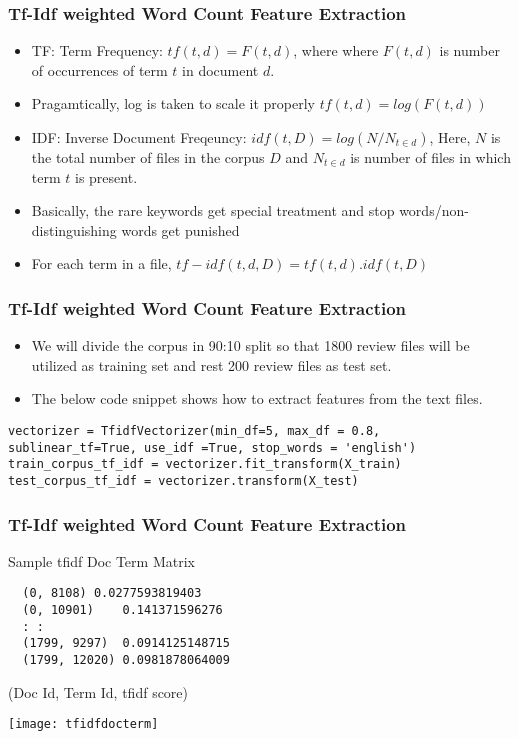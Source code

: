 \begin{frame}[fragile]\frametitle{Tf-Idf weighted Word Count Feature Extraction}
  \begin{itemize}
  \item TF: Term Frequency: $tf(t,d) = F(t,d)$, where where $F(t,d)$ is number of occurrences of term $t$ in document $d$. 
  \item Pragamtically, log is taken to scale it properly $tf(t,d) = log(F(t,d))$
  \item IDF: Inverse Document Freqeuncy: $idf(t,D) = log(N/N_{t \in d})$, Here, $N$ is the total number of files in the corpus $D$ and $N_{t \in d}$ is number of files in which term $t$ is present. 
  \item Basically, the rare keywords get special treatment and stop words/non-distinguishing words get punished
  \item For each term in a file, $tf-idf(t,d,D) = tf(t,d) . idf(t,D)$
  \end{itemize}
\end{frame}

\begin{frame}[fragile]\frametitle{Tf-Idf weighted Word Count Feature Extraction}
  \begin{itemize}
  \item We will divide the corpus in 90:10 split so that 1800 review files will be utilized as training set and rest 200 review files as test set. 
  \item The below code snippet shows how to extract features from the text files.
  \end{itemize}
    \begin{lstlisting}
vectorizer = TfidfVectorizer(min_df=5, max_df = 0.8, sublinear_tf=True, use_idf =True, stop_words = 'english')
train_corpus_tf_idf = vectorizer.fit_transform(X_train)
test_corpus_tf_idf = vectorizer.transform(X_test)
  \end{lstlisting}
\end{frame}

\begin{frame}[fragile]\frametitle{Tf-Idf weighted Word Count Feature Extraction}
Sample tfidf Doc Term Matrix
    \begin{lstlisting}
  (0, 8108)	0.0277593819403
  (0, 10901)	0.141371596276
  :	:
  (1799, 9297)	0.0914125148715
  (1799, 12020)	0.0981878064009
  \end{lstlisting}
  (Doc Id, Term Id, tfidf score)
    \begin{center}
\texttt{[image: tfidfdocterm]}
\end{center}
\end{frame}

